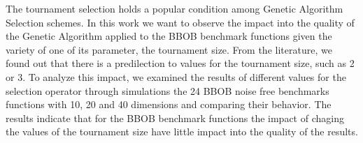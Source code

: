 The tournament selection holds a popular condition among Genetic Algorithm Selection schemes. In this work we want to observe the impact into the quality of the Genetic Algorithm applied to the BBOB benchmark functions given the variety of one of its parameter, the tournament size. From the literature, we found out that there is a predilection to values for the tournament size, such as 2 or 3. To analyze this impact, we examined the results of different values for the selection operator through simulations the 24 BBOB noise free benchmarks functions with 10, 20 and 40 dimensions and comparing their behavior. The results indicate that for the BBOB benchmark functions the impact of chaging the values of the tournament size have little impact into the quality of the results.